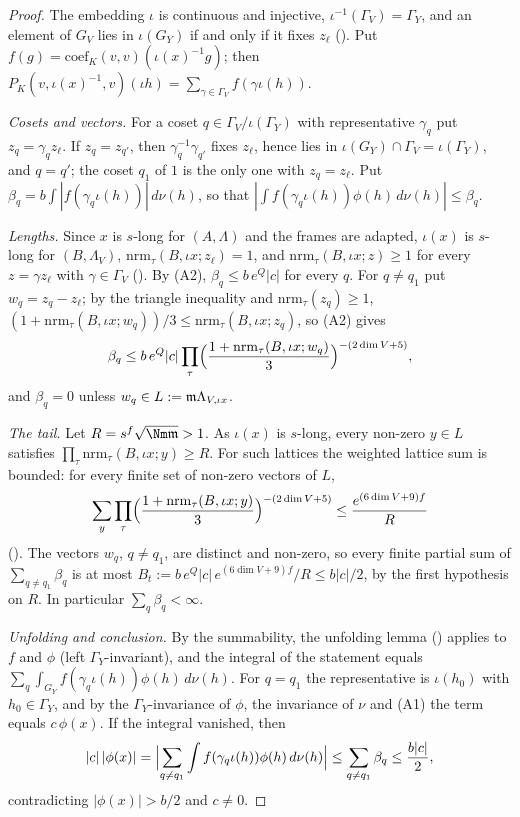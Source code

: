 \begin{proof}
The embedding $\iota$ is continuous and injective, $\iota^{-1}(\Gamma_V)=\Gamma_Y$, and an element of $G_V$ lies in $\iota(G_Y)$ if and only if it
fixes $z_\ell$ (). Put $f(g)=\mathrm{coef}_K(v,v)(\iota(x)^{-1}g)$; then
$P_K(v,\iota(x)^{-1},v)(\iota h)=\sum_{\gamma\in\Gamma_V}f(\gamma\iota(h))$.

\emph{Cosets and vectors.} For a coset $q\in\Gamma_V/\iota(\Gamma_Y)$ with representative $\gamma_q$ put $z_q=\gamma_qz_\ell$. If $z_q=z_{q'}$, then
$\gamma_q^{-1}\gamma_{q'}$ fixes $z_\ell$, hence lies in $\iota(G_Y)\cap\Gamma_V=\iota(\Gamma_Y)$, and $q=q'$; the coset $q_1$ of $1$ is the only one
with $z_q=z_\ell$. Put $\beta_q=b\int|f(\gamma_q\iota(h))|\,d\nu(h)$, so that $|\int f(\gamma_q\iota(h))\phi(h)\,d\nu(h)|\le\beta_q$.

\emph{Lengths.} Since $x$ is $s$-long for $(A,\Lambda)$ and the frames are adapted, $\iota(x)$ is $s$-long for $(B,\Lambda_V)$,
$\mathrm{nrm}_\tau(B,\iota x;z_\ell)=1$, and $\mathrm{nrm}_\tau(B,\iota x;z)\ge1$ for every $z=\gamma z_\ell$ with $\gamma\in\Gamma_V$
(). By (A2), $\beta_q\le b\,e^Q|c|$ for every $q$. For $q\ne q_1$ put
$w_q=z_q-z_\ell$; by the triangle inequality and $\mathrm{nrm}_\tau(z_q)\ge1$, $(1+\mathrm{nrm}_\tau(B,\iota x;w_q))/3\le\mathrm{nrm}_\tau(B,\iota x;z_q)$,
so (A2) gives
\[
\beta_q\le b\,e^Q|c|\prod_\tau\Bigl(\frac{1+\mathrm{nrm}_\tau(B,\iota x;w_q)}{3}\Bigr)^{-(2\dim V+5)},
\]
and $\beta_q=0$ unless $w_q\in L:=\mathfrak m\Lambda_{V,\iota x}$.

\emph{The tail.} Let $R=s^f\sqrt{\Nm\fsm}>1$. As $\iota(x)$ is $s$-long, every non-zero $y\in L$ satisfies $\prod_\tau\mathrm{nrm}_\tau(B,\iota x;y)\ge R$.
For such lattices the weighted lattice sum is bounded: for every finite set of non-zero vectors of $L$,
\[
\sum_y\prod_\tau\Bigl(\frac{1+\mathrm{nrm}_\tau(B,\iota x;y)}{3}\Bigr)^{-(2\dim V+5)}\le\frac{e^{(6\dim V+9)f}}{R}
\]
(). The vectors $w_q$, $q\ne q_1$, are distinct and non-zero, so every finite
partial sum of $\sum_{q\ne q_1}\beta_q$ is at most $B_t:=b\,e^Q|c|\,e^{(6\dim V+9)f}/R\le b|c|/2$, by the first hypothesis on $R$. In particular
$\sum_q\beta_q<\infty$.

\emph{Unfolding and conclusion.} By the summability, the unfolding lemma ()
applies to $f$ and $\phi$ (left $\Gamma_Y$-invariant), and the integral of the statement equals
$\sum_q\int_{G_Y}f(\gamma_q\iota(h))\phi(h)\,d\nu(h)$. For $q=q_1$ the representative is $\iota(h_0)$ with $h_0\in\Gamma_Y$, and by the
$\Gamma_Y$-invariance of $\phi$, the invariance of $\nu$ and (A1) the term equals $c\,\phi(x)$. If the integral vanished, then
\[
|c|\,|\phi(x)|=\Bigl|\sum_{q\ne q_1}\int f(\gamma_q\iota(h))\phi(h)\,d\nu(h)\Bigr|\le\sum_{q\ne q_1}\beta_q\le\frac{b|c|}{2},
\]
contradicting $|\phi(x)|>b/2$ and $c\ne0$.
\end{proof}

